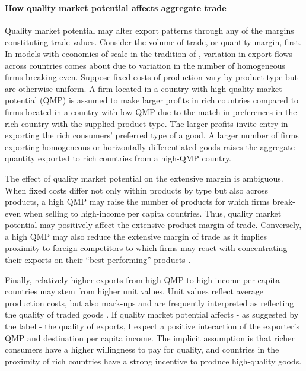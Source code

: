 \documentclass[12pt,a4paper,oneside,times]{article}   	%
\begin{document}
\paragraph{How quality market potential affects aggregate trade}
Quality market potential may alter export patterns through any of the margins constituting trade values. Consider the volume of trade, or quantity margin, first. In models with economies of scale in the tradition of \cite{Krugman1980}, variation in export flows across countries comes about due to variation in the number of homogeneous firms breaking even. Suppose fixed costs of production vary by product type but are otherwise uniform.
A firm located in a country with high quality market potential (QMP) is assumed to make larger profits in rich countries compared to firms located in a country with low QMP due to the match in preferences in the rich country with the supplied product type. The larger profits invite entry in exporting the rich consumers' preferred type of a good. A larger number of firms exporting homogeneous or horizontally differentiated goods raises the aggregate quantity exported to rich countries from a high-QMP country.  

The effect of quality market potential on the extensive margin is ambiguous. When fixed costs differ not only within products by type but also across products, a high QMP may raise the number of products for which firms break-even when selling to high-income per capita countries. Thus, quality market potential may positively affect the extensive product margin of trade. Conversely, a high QMP may also reduce the extensive margin of trade as it implies proximity to foreign competitors \citep{Behrens2009} to which firms may react with concentrating their exports on their ``best-performing'' products \citep{Mayer2014}. 


Finally, relatively higher exports from high-QMP to high-income per capita countries may stem from higher unit values. Unit values reflect average production costs, but also mark-ups and are frequently interpreted as reflecting the quality of traded goods \citep{Hallak2006,Lugovskyy2015,Eaton2019}. If quality market potential affects - as suggested by the label - the quality of exports, I expect a positive interaction of the exporter's QMP and destination per capita income. The implicit assumption is that richer consumers have a higher willingness to pay for quality, and countries in the proximity of rich countries have a strong incentive to produce high-quality goods. 
\end{document}
